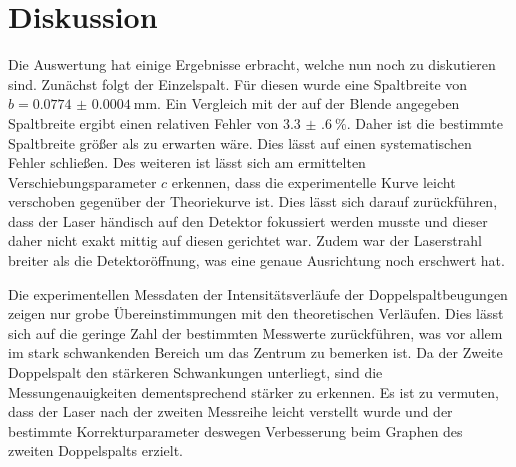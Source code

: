 
\section{Diskussion}
\label{sec:Diskussion}
Die Auswertung hat einige Ergebnisse erbracht, welche nun noch zu diskutieren
sind. Zunächst folgt der Einzelspalt. Für diesen wurde eine Spaltbreite von
$b = \SI{0.0774(4)}{\milli\meter}$. Ein Vergleich mit der auf
der Blende angegeben Spaltbreite ergibt einen relativen Fehler von $\SI{3.3(6)}{\percent}$.
Daher ist die bestimmte Spaltbreite größer als zu erwarten wäre. Dies lässt
 auf einen systematischen Fehler schließen. Des weiteren ist lässt sich am ermittelten
  Verschiebungsparameter $c$ erkennen, dass die experimentelle Kurve leicht
  verschoben gegenüber der Theoriekurve ist. Dies lässt sich darauf zurückführen,
  dass der Laser händisch auf den Detektor fokussiert werden musste und dieser
   daher nicht exakt mittig auf diesen gerichtet war. Zudem war der Laserstrahl breiter
    als die Detektoröffnung, was eine genaue Ausrichtung noch erschwert hat.

    Die experimentellen Messdaten der Intensitätsverläufe der Doppelspaltbeugungen
     zeigen nur grobe Übereinstimmungen mit den theoretischen Verläufen. Dies lässt
      sich auf die geringe Zahl der bestimmten Messwerte zurückführen, was
      vor allem im stark schwankenden Bereich um das Zentrum zu bemerken ist.
      Da der Zweite Doppelspalt den stärkeren Schwankungen unterliegt, sind die
       Messungenauigkeiten dementsprechend stärker zu erkennen. Es ist zu vermuten,
        dass der Laser nach der zweiten Messreihe leicht verstellt wurde und der
        bestimmte Korrekturparameter deswegen Verbesserung beim Graphen des zweiten Doppelspalts erzielt. 
